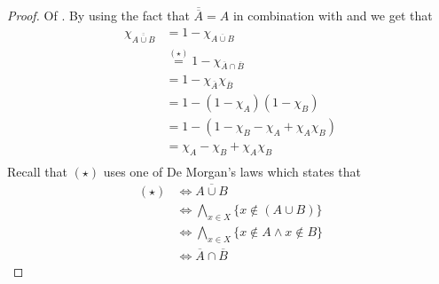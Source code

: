 \begin{proof}
	Of .
	By using the fact that $\overline{\overline{A}}=A$ in combination with
	 and
	 we get that
	\begin{align*}
		\chi_{\overline{\overline{A \cup B}}}
		 & = 1 - \chi_{\overline{A \cup B}}                               \\
		 & \overset{(\star)}{=} 1 - \chi_{\overline{A} \cap \overline{B}} \\
		 & = 1 - \chi_{\overline{A}} \chi_{\overline{B}}                  \\
		 & = 1 - (1 - \chi_A)(1 - \chi_B)                                 \\
		 & = 1 - \left(1 - \chi_B - \chi_A + \chi_A\chi_B\right)          \\
		 & = \chi_A - \chi_B + \chi_A\chi_B                               \\
	\end{align*}
	Recall that $(\star)$ uses one of De Morgan's laws which states that
	\begin{align*}
		(\star) & \iff \overline{A \cup B}                             \\
		        & \iff \bigwedge_{x\in X}\{x\notin (A\cup B)\}         \\
		        & \iff \bigwedge_{x\in X}\{x\notin A \land x\notin B\} \\
		        & \iff \overline{A} \cap \overline{B}
	\end{align*}
\end{proof}
